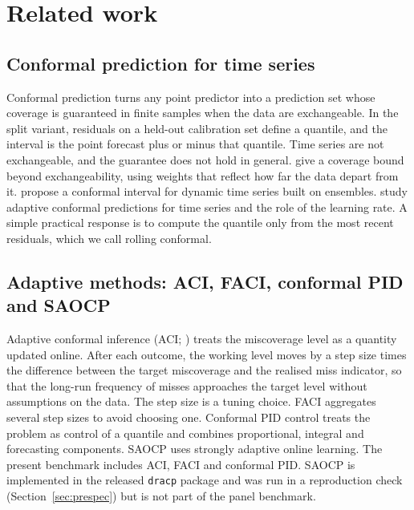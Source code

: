 \section{Related work}\label{sec:related}

\subsection{Conformal prediction for time series}

Conformal prediction \citep{vovk2005algorithmic} turns any point predictor into a prediction set whose coverage is guaranteed in finite samples when the data are exchangeable. In the split variant, residuals on a held-out calibration set define a quantile, and the interval is the point forecast plus or minus that quantile. Time series are not exchangeable, and the guarantee does not hold in general. \citet{barber2023beyond} give a coverage bound beyond exchangeability, using weights that reflect how far the data depart from it. \citet{xu2021enbpi} propose a conformal interval for dynamic time series built on ensembles. \citet{zaffran2022agaci} study adaptive conformal predictions for time series and the role of the learning rate. A simple practical response is to compute the quantile only from the most recent residuals, which we call rolling conformal.

\subsection{Adaptive methods: ACI, FACI, conformal PID and SAOCP}

Adaptive conformal inference (ACI; \citealp{gibbs2021aci}) treats the miscoverage level as a quantity updated online. After each outcome, the working level moves by a step size times the difference between the target miscoverage and the realised miss indicator, so that the long-run frequency of misses approaches the target level without assumptions on the data. The step size is a tuning choice. FACI \citep{gibbs2024faci} aggregates several step sizes to avoid choosing one. Conformal PID control \citep{angelopoulos2023pid} treats the problem as control of a quantile and combines proportional, integral and forecasting components. SAOCP \citep{bhatnagar2023saocp} uses strongly adaptive online learning. The present benchmark includes ACI, FACI and conformal PID. SAOCP is implemented in the released \texttt{dracp} package and was run in a reproduction check (Section~\ref{sec:prespec}) but is not part of the panel benchmark.

